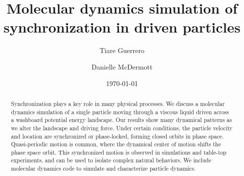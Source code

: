 \documentclass[twocolumn,preprintnumbers,amsmath,amssymb,aps,prb]{revtex4}
\begin{document}

\title{Molecular dynamics simulation of synchronization in driven particles}

\author{Tiare Guerrero}

\author{Danielle McDermott}

\date{\today}

\begin{abstract}
  Synchronization
  plays a key role in many physical processes.
  We discuss a 
  molecular dynamics simulation
  of a single particle
  moving through
  a viscous liquid
  driven 
  across a washboard potential energy landscape.
  Our results show many dynamical patterns
  as we alter the landscape and driving force.
  Under certain conditions,
  the particle velocity and location
  are synchronized or 
  phase-locked,
  forming closed orbits in phase space.
  Quasi-periodic motion is common, 
  where the
  dynamical center of motion shifts the
  phase space orbit.
  This synchronized motion
  is
  observed in 
  simulations and table-top experiments,
  and
  can be used to isolate
  complex natural behaviors.
   We include molecular dynamics code
  to simulate and characterize
  particle dynamics.
\end{abstract}

\maketitle %
\end{document}
